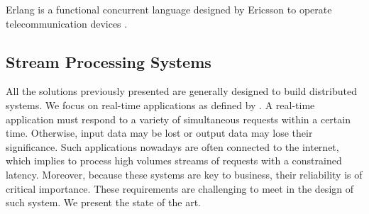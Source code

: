 Erlang is a functional concurrent language designed by Ericsson to operate telecommunication devices \cite{JoeArmstrong}.

\subsection{Stream Processing Systems} \label{chapter3:parallel-execution:stream-processing}

All the solutions previously presented are generally designed to build distributed systems.
We focus on real-time applications as defined by \cite{Hansen1978}.
A real-time application must respond to a variety of simultaneous requests within a certain time.
Otherwise, input data may be lost or output data may lose their significance.
Such applications nowadays are often connected to the internet, which implies to process high volumes streams of requests with a constrained latency.
Moreover, because these systems are key to business, their reliability is of critical importance.
These requirements are challenging to meet in the design of such system.
We present the state of the art.



